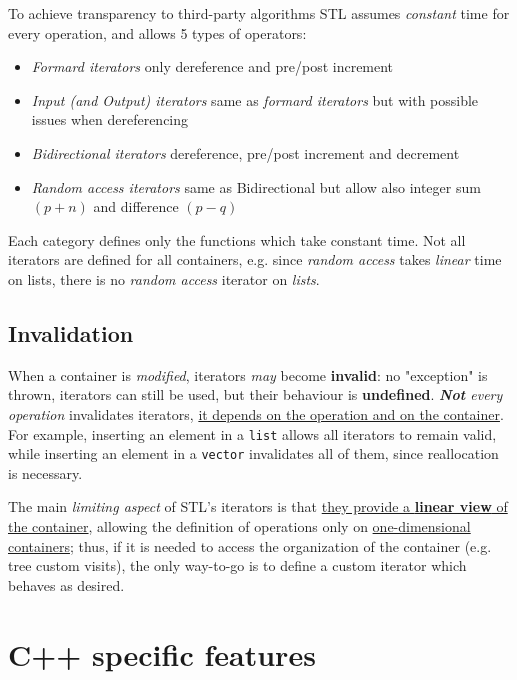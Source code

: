 To achieve transparency to third-party algorithms STL assumes \textit{constant} time for every operation, and allows 5 types of operators:
\begin{itemize}
  \item \textit{Formard iterators} only dereference and pre/post increment
  \item \textit{Input (and Output) iterators} same as \textit{formard iterators} but with possible issues when dereferencing
  \item \textit{Bidirectional iterators} dereference, pre/post increment and decrement
  \item \textit{Random access iterators} same as Bidirectional but allow also integer sum $(p + n)$ and difference $(p - q)$
\end{itemize}
Each category defines only the functions which take constant time. Not all iterators are defined for all
containers, e.g. since \textit{random access} takes \textit{linear} time on lists,
there is no \textit{random access} iterator on \textit{lists}.

\subsection{Invalidation}
When a container is \textit{modified},
iterators \textit{may} become \textbf{invalid}:
no "exception" is thrown,
iterators can still be used,
but their behaviour is \textbf{undefined}.
\textit{\textbf{Not} every operation} invalidates iterators,
\ul{it depends on the operation and on the container}.
For example, inserting an element in a \lstinline|list| allows all iterators to remain valid, while inserting an element in a \lstinline|vector| invalidates all of them, since reallocation is necessary.
\nl

The main \textit{limiting aspect} of STL's iterators is that \ul{they provide a \textbf{linear view} of the container},
allowing the definition of operations only on \ul{one-dimensional containers};
thus, if it is needed to access the organization of the container (e.g. tree custom visits), the only way-to-go is to define a custom iterator which behaves as desired.

\section{C++ specific features}

